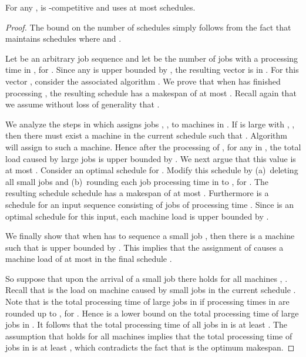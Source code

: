 \documentclass{llncs}
\begin{document}
\begin{theorem}\label{th:guess2}
For any ,  is -competitive and uses at most  schedules.
\end{theorem}
\begin{proof}
The bound on the number of schedules simply follows from the fact that  maintains
 schedules where  and 
.

Let  be an arbitrary job sequence and let  be the number of jobs with a processing time in 
, for . Since any  is upper bounded by , the resulting
vector  is in . For this vector , consider the associated algorithm .
We prove that when  has finished processing , the resulting schedule  has a makespan
of at most . Recall again that we assume without loss of generality
that .

We analyze the steps in which  assigns jobs , , to machines in . If  is
large with , , then there must exist a machine  in the current schedule
 such that . Algorithm  will assign  to such a machine. Hence after
the processing of , for any  in , the total load caused by large jobs is upper bounded
by . We next argue that this value is at most . Consider an optimal
schedule  for . Modify this schedule by (a)~deleting all small jobs and (b)~rounding
each job processing time in  to , for . The resulting schedule 
schedule  has a makespan of at most . Furthermore  is
a schedule for an input sequence consisting of  jobs of processing time . Since
 is an optimal schedule for this input, each machine load  is upper bounded by 
.

We finally show that when  has to sequence a small job , then there is a machine  
such that  is upper bounded by . This implies that the
assignment of  causes a machine load of at most  in the final schedule . 

So suppose that upon the arrival of a small job  there holds 
for all machines , . Recall that  is the load on machine  caused by small
jobs in the current schedule . Note that  is the total processing time of large jobs
in  if processing times in  are rounded up to , for . 
Hence  is a lower bound on the total processing time of large jobs in .
It follows that the total processing time of all jobs in  is at least
. The assumption that 
 holds for all machines  implies that
the total processing time of jobs in  is at least , 
which contradicts the fact that  is the optimum makespan.  \hspace*{\fill}{}
\end{proof}
\end{document}
